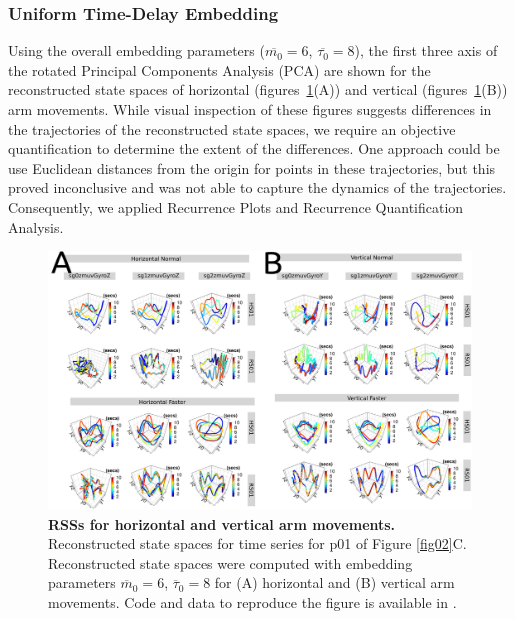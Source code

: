 \documentclass[fleqn,10pt]{wlscirep}
\begin{document}
\subsubsection*{Uniform Time-Delay Embedding}
Using the overall embedding parameters ($\overline{m_0}=6$, $\overline{\tau_0}=8$), the first three axis of the rotated Principal Components Analysis (PCA) are shown for the reconstructed state spaces of horizontal (figures~\ref{fig04}(A)) and vertical (figures~\ref{fig04}(B)) arm movements.
While visual inspection of these figures suggests differences in the trajectories of the reconstructed state spaces, we require an objective quantification to determine the extent of the differences.
One approach could be use Euclidean distances from the origin for points in these trajectories, but this proved inconclusive and was not able to capture the dynamics of the trajectories.
Consequently, we applied Recurrence Plots and Recurrence Quantification Analysis.
\begin{figure}[ht]
\centering
\includegraphics[width=1.0\textwidth]{figures/rss/versions/drawing-v01}
\caption{
	{\bf RSSs for horizontal and vertical arm movements.}
	Reconstructed state spaces for time series for p01 of Figure \ref{fig02}C.
	Reconstructed state spaces were computed with embedding parameters $\overline{m}_0=6$, $\overline{\tau}_0=8$
	for (A) horizontal and (B) vertical arm movements.
	Code and data to reproduce the figure is available in \cite{srep2021}.	
        }
    \label{fig04}
\end{figure}
\end{document}
